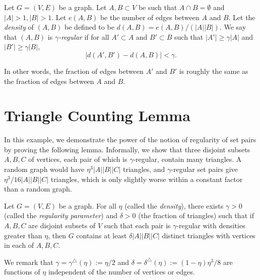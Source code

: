 \documentclass[letterpaper, reqno,11pt]{article}
\begin{document}
\begin{definition}
  Let $G = (V, E)$ be a graph. Let $A, B \subset V$ be such that $A \cap B = \emptyset$ and $|A| > 1, |B| > 1$. Let $e(A, B)$ be the number of edges between $A$ and $B$. Let the \emph{density} of $(A, B)$ be defined to be $d(A, B) = e(A, B)/(|A| |B|)$. We say that $(A, B)$ is \emph{$\gamma$-regular} if for all $A' \subset A$ and $B' \subset B$ such that  $|A'| \geq \gamma |A|$ and $|B'| \geq \gamma |B|$,
  $$ \left|d\left(A', B'\right) - d(A, B)\right| < \gamma. $$
\end{definition}

In other words, the fraction of edges between $A'$ and $B'$ is roughly the same as the fraction of edges between $A$ and $B$.

\section{Triangle Counting Lemma}

In this example, we demonstrate the power of the notion of regularity of set pairs by proving the following lemma. Informally, we show that three disjoint subsets $A, B, C$ of vertices, each pair of which is $\gamma$-regular, contain many triangles. A random graph would have $\eta^3 |A||B||C|$ triangles, and $\gamma$-regular set pairs give $\eta^3/16 |A| |B| |C|$ triangles, which is only slightly worse within a constant factor than a random graph.

\begin{lemma} \label{lem:triangle-counting}
  Let $G = (V, E)$ be a graph. For all $\eta$ (called the \emph{density}), there exists $\gamma > 0$ (called the \emph{regularity parameter}) and $\delta > 0$ (the fraction of triangles) such that if $A, B, C$ are disjoint subsets of $V$ such that each pair is $\gamma$-regular with densities greater than $\eta$, then $G$ contains at least $\delta |A| |B| |C|$ distinct triangles with vertices in each of $A, B, C$.
\end{lemma}

We remark that $\gamma = \gamma^\triangle(\eta) := \eta/2$ and $\delta = \delta^\triangle(\eta) := (1 - \eta) \eta^3/8$ are functions of $\eta$ independent of the number of vertices or edges.
\end{document}
